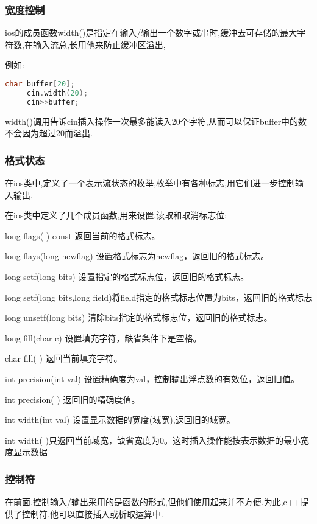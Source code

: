 \documentclass{article}
\begin{document}
\subsubsection{宽度控制}
\label{sec-10-3-1}

ios的成员函数width()是指定在输入/输出一个数字或串时,缓冲去可存储的最大字符数,在输入流总,长用他来防止缓冲区溢出,

例如:
\begin{lstlisting}[language=c++]
     char buffer[20];
     cin.width(20);
     cin>>buffer;
\end{lstlisting}
width()调用告诉cin插入操作一次最多能读入20个字符,从而可以保证buffer中的数不会因为超过20而溢出.
\subsubsection{格式状态}
\label{sec-10-3-2}

在ios类中,定义了一个表示流状态的枚举,枚举中有各种标志,用它们进一步控制输入输出,

在ios类中定义了几个成员函数,用来设置,读取和取消标志位:

long flags( ) const 返回当前的格式标志。 

long flays(long newflag) 设置格式标志为newflag，返回旧的格式标志。 

long setf(long bits) 设置指定的格式标志位，返回旧的格式标志。 

long setf(long bits,long field)将field指定的格式标志位置为bits，返回旧的格式标志  

long unsetf(long bits) 清除bits指定的格式标志位，返回旧的格式标志。 

long fill(char c) 设置填充字符，缺省条件下是空格。 

char fill( ) 返回当前填充字符。 

int precision(int val) 设置精确度为val，控制输出浮点数的有效位，返回旧值。 

int precision( ) 返回旧的精确度值。 

int width(int val) 设置显示数据的宽度(域宽),返回旧的域宽。 

int width( )只返回当前域宽，缺省宽度为0。这时插入操作能按表示数据的最小宽度显示数据 
\subsubsection{控制符}
\label{sec-10-3-3}

在前面.控制输入/输出采用的是函数的形式,但他们使用起来并不方便.为此,c++提供了控制符,他可以直接插入或析取运算中.
\end{document}
